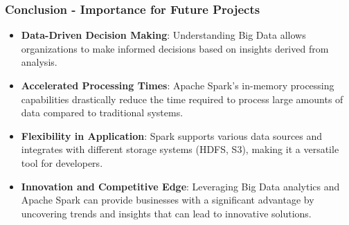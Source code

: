 \documentclass[aspectratio=169]{beamer}
\begin{document}
\begin{frame}[fragile]
    \frametitle{Conclusion - Importance for Future Projects}
    
    \begin{itemize}
        \item \textbf{Data-Driven Decision Making}: Understanding Big Data allows organizations to make informed decisions based on insights derived from analysis.
        \item \textbf{Accelerated Processing Times}: Apache Spark's in-memory processing capabilities drastically reduce the time required to process large amounts of data compared to traditional systems.
        \item \textbf{Flexibility in Application}: Spark supports various data sources and integrates with different storage systems (HDFS, S3), making it a versatile tool for developers.
        \item \textbf{Innovation and Competitive Edge}: Leveraging Big Data analytics and Apache Spark can provide businesses with a significant advantage by uncovering trends and insights that can lead to innovative solutions.
    \end{itemize}
\end{frame}
\end{document}
